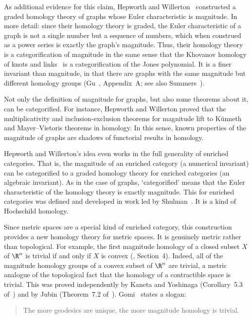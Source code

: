 As additional evidence for this claim, Hepworth%
%
% 
and Willerton~\cite{HeWi}%
%
% 
constructed a graded homology%
% 
% 
theory of graphs%
%
% 
whose Euler characteristic is magnitude.  In more detail: since their
homology theory is graded, the Euler characteristic of a graph is not a
single number but a sequence of numbers, which when construed as a power
series is exactly the graph's magnitude.  Thus, their homology theory is a
categorification of magnitude in the same sense that the Khovanov%
%
%
homology of knots and 
links~\cite{Khov} is a categorification of the Jones%
%
%
polynomial.  It is a finer invariant than magnitude, in that there are
graphs with the same magnitude but different homology groups (Gu~\cite{Gu},
Appendix~A; see also Summers~\cite{Summ}).

Not only the definition of magnitude for graphs, but also some theorems
about it, can be categorified.  For instance, Hepworth and Willerton proved
that the multiplicativity and inclusion-exclusion theorems for magnitude
lift to K\"unneth and Mayer--Vietoris theorems in homology.  In this sense,
known properties of the magnitude of graphs are shadows of functorial
results in homology.

Hepworth and Willerton's idea even works in the full generality of enriched
categories.  That is, the magnitude of an enriched category (a numerical
invariant) can be categorified to a graded homology theory for enriched
categories (an algebraic invariant).  As in the case of graphs,
`categorified' means that the Euler characteristic of the homology theory
is exactly magnitude.  This  for enriched categories was defined and developed in work led by
Shulman~\cite{MHECMS}.%
%
% 
It is a kind of Hochschild homology.

Since metric spaces are a special kind of enriched category, this
construction provides a new homology theory for metric spaces.  It is
genuinely metric rather than topological.  For example, the first magnitude
homology of a closed subset $X$ of $\R^n$ is trivial if and only if $X$ is
convex%
% 
% 
(\cite{MHECMS}, Section~4).  Indeed, all of the magnitude homology groups
of a convex subset of $\R^n$ are trivial, a metric analogue of the
topological fact that the homology of a contractible space is
trivial.  This was proved independently by Kaneta and Yoshinaga
(Corollary~5.3 of~\cite{KaYo}) and by Jubin (Theorem~7.2 of~\cite{Jubi}).
Gomi~\cite{GomiMHG} states a slogan:
%
% 
\begin{quote}
The more geodesics are unique, the more magnitude homology is trivial.
\end{quote}


